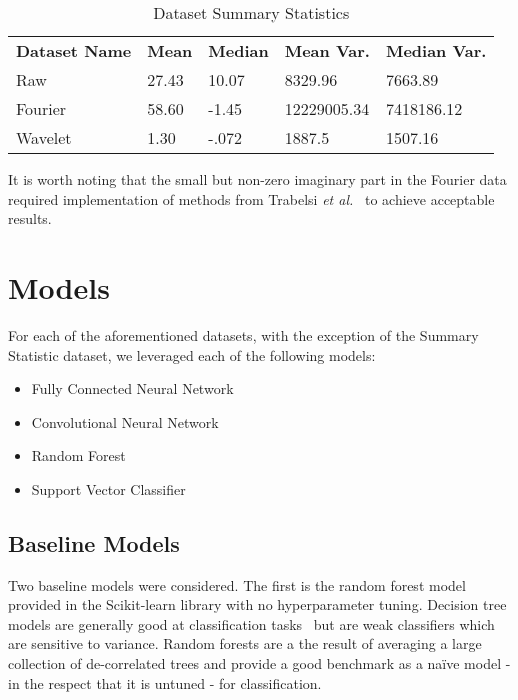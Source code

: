 \renewcommand{\thefootnote}{*} 
\begin{table}[h]
\centering
\label{Tab:summary}	
\begin{tabular}{l|llll}
\textbf{Dataset Name} & \textbf{Mean} & \textbf{Median} & \textbf{Mean Var.} & \textbf{Median Var.} \\\cline{1-5}
Raw         & 27.43    & 10.07    & 8329.96    & 7663.89 \\
Fourier       & 58.60\footnotemark    & -1.45    & 12229005.34    & 7418186.12 \\
Wavelet        & 1.30    & -.072    & 1887.5    & 1507.16 \\             
\end{tabular}
\caption{Dataset Summary Statistics}
\end{table}

\renewcommand{\thefootnote}{1}
It is worth noting that the small but non-zero imaginary part in the Fourier data required implementation of methods from Trabelsi \textit{et al.}~\cite{trabelsi2017deep} to achieve acceptable results.

\section{Models}
For each of the aforementioned datasets, with the exception of the Summary Statistic dataset, we leveraged each of the following models:
\begin{itemize}
\item Fully Connected Neural Network
\item Convolutional Neural Network
\item Random Forest
\item Support Vector Classifier	
\end{itemize}

\subsection{Baseline Models} \label{other models}
Two baseline models were considered.
The first is the random forest model provided in the Scikit-learn library with no hyperparameter tuning.
Decision tree models are generally good at classification tasks~\cite{hastie01statisticallearning} but are weak classifiers which are sensitive to variance.
Random forests are a the result of averaging a large collection of de-correlated trees and provide a good benchmark as a na\"ive model - in the respect that it is untuned - for classification.

